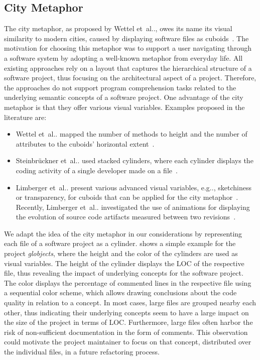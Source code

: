 \documentclass[runningheads]{llncs}
\makeatletter
\DeclareRobustCommand\onedot{\futurelet\@let@token\@onedot}
\def\@onedot{\ifx\@let@token.\else.\null\fi\xspace}
\def\etal{et~al\onedot}
\def\eg{e.g\onedot,\xspace}
\makeatother
\begin{document}
\subsection{City Metaphor}
The city metaphor, as proposed by Wettel \etal, owes its name its visual similarity to modern cities, caused by displaying software files as cuboids~\cite{Wettel2007SoftwareCities}.
The motivation for choosing this metaphor was to support a user navigating through a software system by adopting a well-known metaphor from everyday life.
All existing approaches rely on a layout that captures the hierarchical structure of a software project, thus focusing on the architectural aspect of a project.
Therefore, the approaches do not support program comprehension tasks related to the underlying semantic concepts of a software project.
One advantage of the city metaphor is that they offer various visual variables.
Examples proposed in the literature are:
\begin{itemize}
    \item Wettel \etal mapped the number of methods to height and the number of attributes to the cuboids' horizontal extent~\cite{Wettel2007SoftwareCities}.
    \item Steinbrückner \etal used stacked cylinders, where each cylinder displays the coding activity of a single developer made on a file~\cite{steinbruckner2013-evolution}.
    \item Limberger \etal present various advanced visual variables, \eg sketchiness or transparency, for cuboids that can be applied for the city metaphor~\cite{limberger2019-softwaremap}.
    Recently, Limberger \etal investigated the use of animations for displaying the evolution of source code artifacts measured between two revisions~\cite{limberger2021-procedural}.
\end{itemize}
We adapt the idea of the city metaphor in our considerations by representing each file of a software project as a cylinder.
 shows a simple example for the project \textit{globjects}, where the height and the color of the cylinders are used as visual variables.
The height of the cylinder displays the \ac{LOC} of the respective file, thus revealing the impact of underlying concepts for the software project.
The color displays the percentage of commented lines in the respective file using a sequential color scheme, which allows drawing conclusions about the code quality in relation to a concept.
In most cases, large files are grouped nearby each other, thus indicating their underlying concepts seem to have a large impact on the size of the project in terms of \ac{LOC}.
Furthermore, large files often harbor the risk of non-sufficient documentation in the form of comments.
This observation could motivate the project maintainer to focus on that concept, distributed over the individual files, in a future refactoring process.
\end{document}
